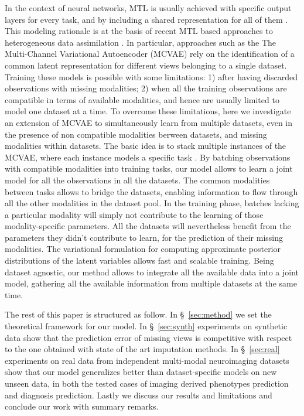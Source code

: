 In the context of neural networks, MTL is usually achieved with specific output layers for every task, and by including a shared representation for all of them \citep{Dorado-Moreno2020}.
This modeling rationale is at the basis of recent MTL based approaches to heterogeneous data assimilation \citep{Wu2018, Antelmi2019, Shi2019}.
In particular, approaches such as the The Multi-Channel Variational Autoencoder (MCVAE) \citep{Antelmi2019} rely on the identification of a common latent representation for different views belonging to a single dataset.
Training these models is possible with some limitations:
1) after having discarded observations with missing modalities;
2) when all the training observations are compatible in terms of available modalities, and hence are usually limited to model one dataset at a time.
%
To overcome these limitations, here we investigate an extension of MCVAE to simultaneously learn from multiple datasets, even in the presence of non compatible modalities berween datasets, and missing modalities within datasets.
The basic idea is to stack multiple instances of the MCVAE, where each instance models a specific task .
By batching observations with compatible modalities into training tasks, our model allows to learn a joint model for all the observations in all the datasets.
The common modalities between tasks allows to bridge the datasets, enabling information to flow through all the other modalities in the dataset pool.
In the training phase, batches lacking a particular modality will simply not contribute to the learning of those modality-specific parameters.
All the datasets will nevertheless benefit from the parameters they didn't contribute to learn, for the prediction of their missing modalities.
The variational formulation for computing approximate posterior distributions of the latent variables allows fast and scalable training.
Being dataset agnostic, our method allows to integrate all the available data into a joint model, gathering  all the available information from multiple datasets at the same time.

The rest of this paper is structured as follow.
In \S~\ref{sec:method} we set the theoretical framework for our model.
In \S~\ref{sec:synth} experiments on synthetic data show that the prediction error of missing views is competitive with respect to the one obtained with state of the art imputation methods.
In \S~\ref{sec:real} experiments on real data from independent multi-modal neuroimaging datasets show that our model generalizes better than dataset-specific models on new unseen data, in both the tested cases of imaging derived phenotypes prediction and diagnosis prediction.
Lastly we discuss our results and limitations and conclude our work with summary remarks.
